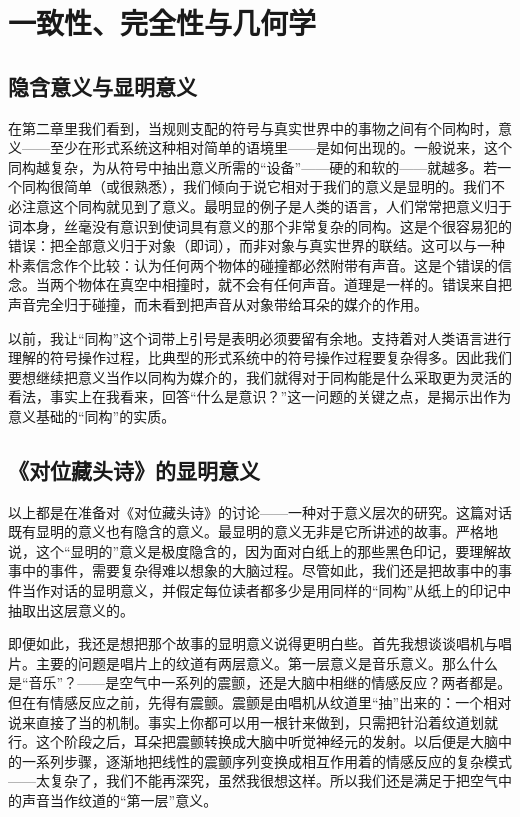 
\chapter{一致性、完全性与几何学}

\section{隐含意义与显明意义}

在第二章里我们看到，当规则支配的符号与真实世界中的事物之间有个同构时，意义——至少在形式系统这种相对简单的语境里——是如何出现的。一般说来，这个同构越复杂，为从符号中抽出意义所需的“设备”——硬的和软的——就越多。若一个同构很简单（或很熟悉），我们倾向于说它相对于我们的意义是显明的。我们不必注意这个同构就见到了意义。最明显的例子是人类的语言，人们常常把意义归于词本身，丝毫没有意识到使词具有意义的那个非常复杂的同构。这是个很容易犯的错误：把全部意义归于对象（即词），而非对象与真实世界的联结。这可以与一种朴素信念作个比较：认为任何两个物体的碰撞都必然附带有声音。这是个错误的信念。当两个物体在真空中相撞时，就不会有任何声音。道理是一样的。错误来自把声音完全归于碰撞，而未看到把声音从对象带给耳朵的媒介的作用。

以前，我让“同构”这个词带上引号是表明必须要留有余地。支持着对人类语言进行理解的符号操作过程，比典型的形式系统中的符号操作过程要复杂得多。因此我们要想继续把意义当作以同构为媒介的，我们就得对于同构能是什么采取更为灵活的看法，事实上在我看来，回答“什么是意识？”这一问题的关键之点，是揭示出作为意义基础的“同构”的实质。

\section{《对位藏头诗》的显明意义}

以上都是在准备对《对位藏头诗》的讨论——一种对于意义层次的研究。这篇对话既有显明的意义也有隐含的意义。最显明的意义无非是它所讲述的故事。严格地说，这个“显明的”意义是极度隐含的，因为面对白纸上的那些黑色印记，要理解故事中的事件，需要复杂得难以想象的大脑过程。尽管如此，我们还是把故事中的事件当作对话的显明意义，并假定每位读者都多少是用同样的“同构”从纸上的印记中抽取出这层意义的。

即便如此，我还是想把那个故事的显明意义说得更明白些。首先我想谈谈唱机与唱片。主要的问题是唱片上的纹道有两层意义。第一层意义是音乐意义。那么什么是“音乐”？——是空气中一系列的震颤，还是大脑中相继的情感反应？两者都是。但在有情感反应之前，先得有震颤。震颤是由唱机从纹道里“抽”出来的：一个相对说来直接了当的机制。事实上你都可以用一根针来做到，只需把针沿着纹道划就行。这个阶段之后，耳朵把震颤转换成大脑中听觉神经元的发射。以后便是大脑中的一系列步骤，逐渐地把线性的震颤序列变换成相互作用着的情感反应的复杂模式——太复杂了，我们不能再深究，虽然我很想这样。所以我们还是满足于把空气中的声音当作纹道的“第一层”意义。

